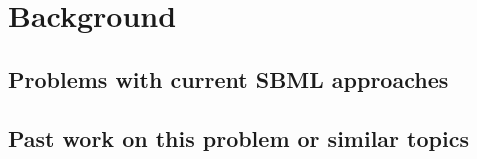 
\section{ Background }
\label{background}

\subsection{ Problems with current SBML approaches }



\subsection{ Past work on this problem or similar topics }


